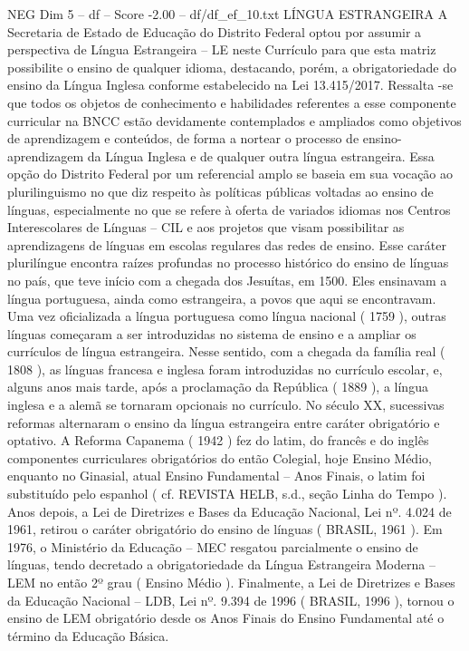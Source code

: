 \begin{textsample}{NEG Dim 5 – df – Score -2.00 – df/df\_ef\_10.txt}  \label{ex:f5_neg_132}
LÍNGUA ESTRANGEIRA A Secretaria de Estado de Educação do Distrito Federal optou por assumir a perspectiva de Língua Estrangeira – LE neste Currículo para que esta matriz possibilite o ensino de qualquer idioma, destacando, porém, a obrigatoriedade do ensino da Língua Inglesa conforme estabelecido na Lei 13.415/2017.
Ressalta -se que todos os objetos de conhecimento e habilidades referentes a esse componente curricular na BNCC estão devidamente contemplados e ampliados como objetivos de aprendizagem e conteúdos, de forma a nortear o processo de ensino-aprendizagem da Língua Inglesa e de qualquer outra língua estrangeira.
Essa opção do Distrito Federal por um referencial amplo se baseia em sua vocação ao plurilinguismo no que diz respeito às políticas públicas voltadas ao ensino de línguas, especialmente no que se refere à oferta de variados idiomas nos Centros Interescolares de Línguas – CIL e aos projetos que visam possibilitar as aprendizagens de línguas em escolas regulares das redes de ensino.
Esse caráter plurilíngue encontra raízes profundas no processo histórico do ensino de línguas no país, que teve início com a chegada dos Jesuítas, em 1500.
Eles ensinavam a língua portuguesa, ainda como estrangeira, a povos que aqui se encontravam.
Uma vez oficializada a língua portuguesa como língua nacional ( 1759 ), outras línguas começaram a ser introduzidas no sistema de ensino e a ampliar os currículos de língua estrangeira.
Nesse sentido, com a chegada da família real ( 1808 ), as línguas francesa e inglesa foram introduzidas no currículo escolar, e, alguns anos mais tarde, após a proclamação da República ( 1889 ), a língua inglesa e a alemã se tornaram opcionais no currículo.
No século XX, sucessivas reformas alternaram o ensino da língua estrangeira entre caráter obrigatório e optativo.
A Reforma Capanema ( 1942 ) fez do latim, do francês e do inglês componentes curriculares obrigatórios do então Colegial, hoje Ensino Médio, enquanto no Ginasial, atual Ensino Fundamental – Anos Finais, o latim foi substituído pelo espanhol ( cf.
REVISTA HELB, s.d., seção Linha do Tempo ).
Anos depois, a Lei de Diretrizes e Bases da Educação Nacional, Lei nº. 4.024 de 1961, retirou o caráter obrigatório do ensino de línguas ( BRASIL, 1961 ).
Em 1976, o Ministério da Educação – MEC resgatou parcialmente o ensino de línguas, tendo decretado a obrigatoriedade da Língua Estrangeira Moderna – LEM no então 2º grau ( Ensino Médio ).
Finalmente, a Lei de Diretrizes e Bases da Educação Nacional – LDB, Lei nº. 9.394 de 1996 ( BRASIL, 1996 ), tornou o ensino de LEM obrigatório desde os Anos Finais do Ensino Fundamental até o término da Educação Básica.

\end{textsample}
